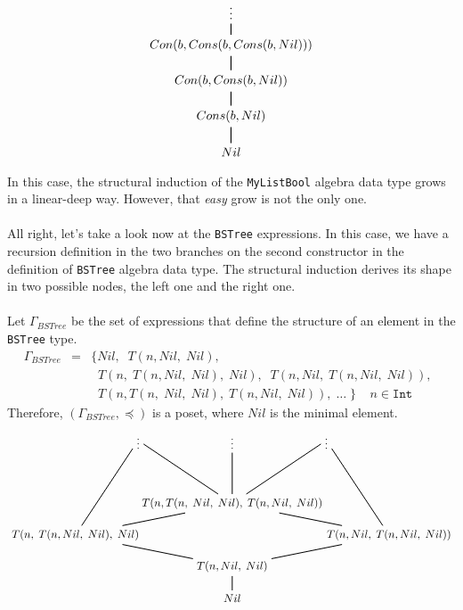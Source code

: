 \documentclass{report}
\theoremstyle{definition}
\theoremstyle{definition}
\newcommand{\ttt}[1]{\texttt{#1}}
\newcommand{\tav}{\;\;}
\begin{document}
\begin{align*}
	\begin{tikzpicture}                                   
	\node (a) at (0,3) {$\vdots$};                        
	\node (b) at (0,2) {$Con(b, Cons(b, Cons(b, Nil)))$}; 
	\node (c) at (0,1) {$Con(b, Cons(b, Nil))$};          
	\node (d) at (0,0) {$Cons(b, Nil)$};                  
	\node (min) at (0,-1) {$Nil$};                        
	\draw [thick](min) -- (d) -- (c) -- (b) -- (a);       
	\end{tikzpicture}                                     
\end{align*}
In this case, the structural induction of the \ttt{MyListBool} algebra data type grows in a linear-deep way. However, that \textit{easy} grow is not the only one.\\\\
All right, let's take a look now at the \ttt{BSTree} expressions. In this case, we have a recursion definition in the two branches on the second constructor in the definition of \ttt{BSTree} algebra data type. The structural induction derives its shape in two possible nodes, the left one and the right one.\\\\
Let $\Gamma_{BSTree}$ be the set of expressions that define the structure of an element in the \ttt{BSTree} type.
\begin{eqnarray*}
	\Gamma_{BSTree} & = & \{ Nil, \tav T(n, Nil, \; Nil), \\
	&& \tav T(n, \; T(n, Nil, \; Nil), \; Nil), \tav T(n, Nil, \; T(n, Nil, \; Nil)), \tav  \\
	&& \tav T(n, T(n, \; Nil, \; Nil), \; T(n, Nil, \; Nil)), \; \ldots \; \} \tav \tav n \in \ttt{Int}
\end{eqnarray*}
Therefore, $(\Gamma_{BSTree}, \preceq)$ is a poset, where $Nil$ is the minimal element.
\begin{align*}
	\begin{tikzpicture}                                                       
	\node (a3) at (3,4) {$\vdots$};                                           
	\node (a2) at (0,4) {$\vdots$};                                           
	\node (a1) at (-3,4) {$\vdots$};                                          
	\node (c2) at (0,2) {$T(n, T(n, \; Nil, \; Nil), \; T(n, Nil, \; Nil))$}; 
	\node (c3) at (5,1) {$T(n, Nil, \; T(n, Nil, \; Nil))$};                  
	\node (c1) at (-5,1) {$T(n, \; T(n, Nil, \; Nil), \; Nil)$};              
	\node (d) at (0,0) {$T(n, Nil, \; Nil)$};                                 
	\node (min) at (0,-1) {$Nil$};                                            
	\draw [thick](min) -- (d) -- (c1) -- (c2) -- (a2);                        
	\draw [thick](c1) -- (a1);                                                
	\draw [thick](c3) -- (a3);                                                
	\draw [thick](c2) -- (a3);                                                
	\draw [thick](d) -- (c3) -- (c2) -- (a1);                                 
	\end{tikzpicture}                                                         
\end{align*}
\end{document}

